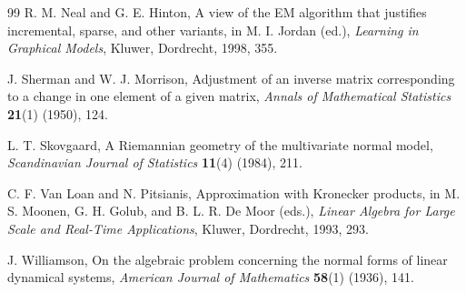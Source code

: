 \documentclass[11pt]{article}
\theoremstyle{definition}
\theoremstyle{remark}
\newcommand{\ndash}{\textendash}
\begin{document}
\begin{thebibliography}{99}
R. M. Neal and G. E. Hinton, A view of the EM algorithm that justifies incremental, sparse, and other variants, in M. I. Jordan (ed.), \emph{Learning in Graphical Models}, Kluwer, Dordrecht, 1998, 355\ndash 371.

J. Sherman and W. J. Morrison, Adjustment of an inverse matrix corresponding to a change in one element of a given matrix, \emph{Annals of Mathematical Statistics} \textbf{21}(1) (1950), 124\ndash 127.

L. T. Skovgaard, A Riemannian geometry of the multivariate normal model, \emph{Scandinavian Journal of Statistics} \textbf{11}(4) (1984), 211\ndash 223.

C. F. Van Loan and N. Pitsianis, Approximation with Kronecker products, in M. S. Moonen, G. H. Golub, and B. L. R. De Moor (eds.), \emph{Linear Algebra for Large Scale and Real-Time Applications}, Kluwer, Dordrecht, 1993, 293\ndash 314.

J. Williamson, On the algebraic problem concerning the normal forms of linear dynamical systems, \emph{American Journal of Mathematics} \textbf{58}(1) (1936), 141\ndash 163.

\end{thebibliography}
\end{document}
